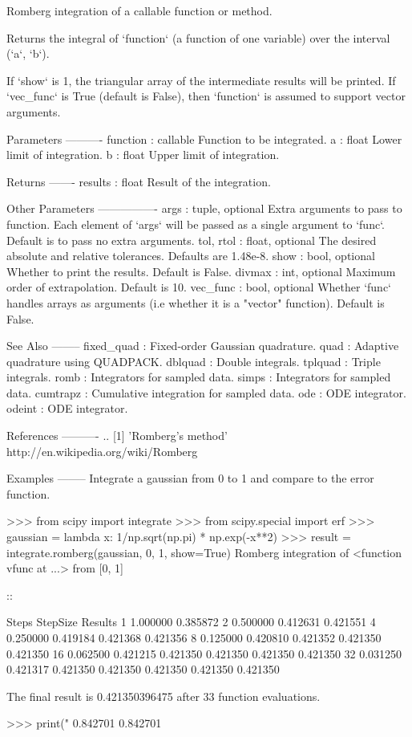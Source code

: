 \begin{DoxyVerb}Romberg integration of a callable function or method.

Returns the integral of `function` (a function of one variable)
over the interval (`a`, `b`).

If `show` is 1, the triangular array of the intermediate results
will be printed.  If `vec_func` is True (default is False), then
`function` is assumed to support vector arguments.

Parameters
----------
function : callable
    Function to be integrated.
a : float
    Lower limit of integration.
b : float
    Upper limit of integration.

Returns
-------
results  : float
    Result of the integration.

Other Parameters
----------------
args : tuple, optional
    Extra arguments to pass to function. Each element of `args` will
    be passed as a single argument to `func`. Default is to pass no
    extra arguments.
tol, rtol : float, optional
    The desired absolute and relative tolerances. Defaults are 1.48e-8.
show : bool, optional
    Whether to print the results. Default is False.
divmax : int, optional
    Maximum order of extrapolation. Default is 10.
vec_func : bool, optional
    Whether `func` handles arrays as arguments (i.e whether it is a
    "vector" function). Default is False.

See Also
--------
fixed_quad : Fixed-order Gaussian quadrature.
quad : Adaptive quadrature using QUADPACK.
dblquad : Double integrals.
tplquad : Triple integrals.
romb : Integrators for sampled data.
simps : Integrators for sampled data.
cumtrapz : Cumulative integration for sampled data.
ode : ODE integrator.
odeint : ODE integrator.

References
----------
.. [1] 'Romberg's method' http://en.wikipedia.org/wiki/Romberg%

Examples
--------
Integrate a gaussian from 0 to 1 and compare to the error function.

>>> from scipy import integrate
>>> from scipy.special import erf
>>> gaussian = lambda x: 1/np.sqrt(np.pi) * np.exp(-x**2)
>>> result = integrate.romberg(gaussian, 0, 1, show=True)
Romberg integration of <function vfunc at ...> from [0, 1]

::

   Steps  StepSize  Results
       1  1.000000  0.385872
       2  0.500000  0.412631  0.421551
       4  0.250000  0.419184  0.421368  0.421356
       8  0.125000  0.420810  0.421352  0.421350  0.421350
      16  0.062500  0.421215  0.421350  0.421350  0.421350  0.421350
      32  0.031250  0.421317  0.421350  0.421350  0.421350  0.421350  0.421350

The final result is 0.421350396475 after 33 function evaluations.

>>> print("%
0.842701 0.842701\end{DoxyVerb}
 \hypertarget{namespacescipy_1_1integrate_1_1quadrature_a49ca3dfd374e9956fe74ea63deba119d}{}
